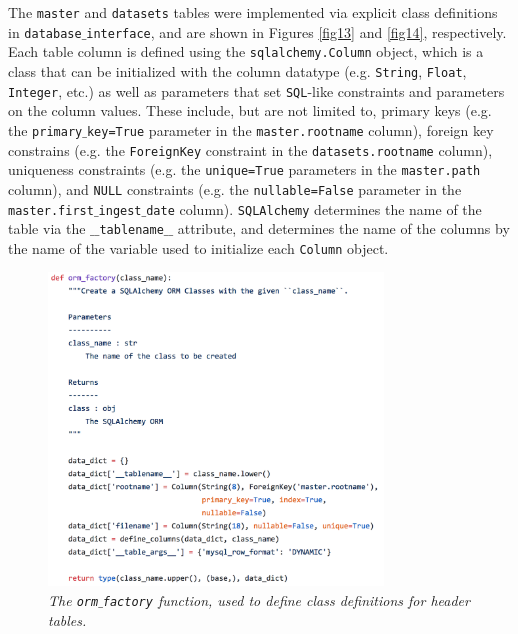 \documentclass[10pt,journal,compsoc]{IEEEtran}
\begin{document}
The \texttt{master} and \texttt{datasets} tables were implemented via explicit class definitions in \texttt{database$\_$interface}, and are shown in Figures \ref{fig13} and \ref{fig14},
respectively.  Each table column is defined using the \texttt{sqlalchemy.Column} object, which is a class that can be initialized with the column datatype (e.g. \texttt{String},
\texttt{Float}, \texttt{Integer}, etc.) as well as parameters that set \texttt{SQL}-like constraints and parameters on the column values.  These include, but are not limited to,
primary keys (e.g. the \texttt{primary$\_$key=True} parameter in the \texttt{master.rootname} column), foreign key constrains (e.g. the \texttt{ForeignKey} constraint in the
\texttt{datasets.rootname} column), uniqueness constraints (e.g. the \texttt{unique=True} parameters in the \texttt{master.path} column), and \texttt{NULL} constraints (e.g. the
\texttt{nullable=False} parameter in the \texttt{master.first$\_$ingest$\_$date} column).  \texttt{SQLAlchemy} determines the name of the table via the \texttt{$\_$$\_$tablename$\_$$\_$}
attribute, and determines the name of the columns by the name of the variable used to initialize each \texttt{Column} object.

\begin{figure}[!h]
\centering
\includegraphics[width=3.5in]{./figures/orm_factory.png}
\caption{\textit{The \texttt{orm$\_$factory} function, used to define class definitions for header tables.}}
\label{fig15}
\end{figure}
\end{document}
